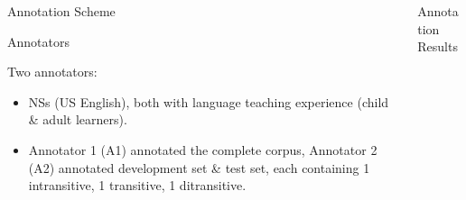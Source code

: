 \documentclass[final,t]{beamer}
\begin{document}
\begin{frame}{}
\begin{columns}[t]
\begin{column}{.33\linewidth}
\begin{block}{Annotation Scheme}
\begin{center}
\begin{minipage}{.85\textwidth}
\begin{enumerate}
\end{enumerate}



\end{minipage}
\end{center}
\vspace{-.5em}
\end{block}

\begin{block}{Annotators}
\begin{center}
\begin{minipage}{.85\textwidth}
Two annotators:
\begin{itemize}
	\item NSs (US English), both with language teaching experience (child \& adult learners).
	\item Annotator 1 (A1) annotated the complete corpus, Annotator 2 (A2) annotated development set \& test set, each containing 1 intransitive, 1 transitive, 1 ditransitive.
\end{itemize}
\end{minipage}
\end{center}
\vspace{-.5em}
\end{block}


\end{column}

\begin{column}{.33\linewidth}
\vspace{-1em}
\begin{block}{Annotation Results}
\begin{center}
\begin{minipage}{.85\textwidth}


\end{minipage}
\end{center}
\end{block}
\end{column}
\end{columns}
\end{frame}
\end{document}
